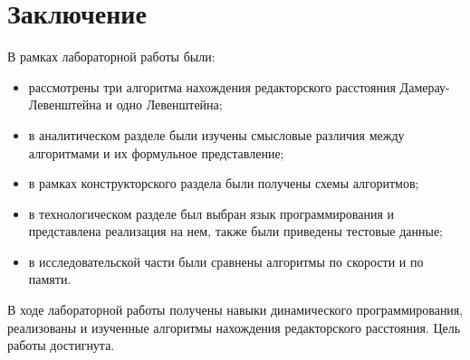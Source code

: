 \chapter*{Заключение}

В рамках лабораторной работы были:

\begin{itemize}
	\item рассмотрены три алгоритма нахождения редакторского расстояния Дамерау-Левенштейна и одно Левенштейна;
	\item в аналитическом разделе были изучены смысловые различия между алгоритмами и их формульное представление;
	\item в рамках конструкторского раздела были получены схемы алгоритмов;
	\item в технологическом разделе был выбран язык программирования и представлена реализация на нем, также были приведены тестовые данные;
	\item в исследовательской части были сравнены алгоритмы по скорости и по памяти. 
\end{itemize}
 
В ходе лабораторной работы получены навыки динамического программирования, реализованы и изученные алгоритмы нахождения редакторского расстояния.
Цель работы достигнута.
